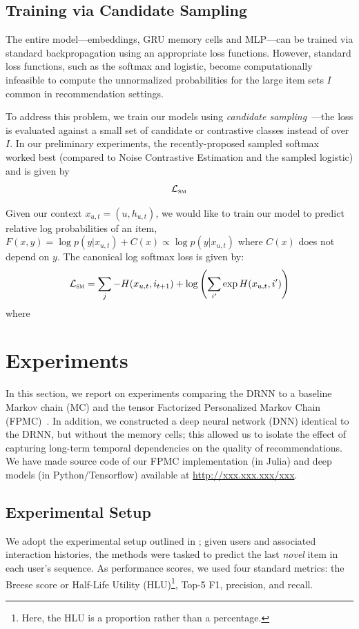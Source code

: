 \documentclass{sig-alternate-05-2015}
\begin{document}
\subsection{Training via Candidate Sampling}
The entire model---embeddings, GRU memory cells and MLP---can be trained via standard backpropagation using an appropriate loss functions. However, standard loss functions, such as the softmax and logistic, become computationally infeasible to compute the unnormalized probabilities for the large item sets $I$ common in recommendation settings.

To address this problem, we train our models using \emph{candidate sampling}~\cite{TFCandidateSampling}---the loss is evaluated against a small set of candidate or contrastive classes instead of over $I$. In our preliminary experiments, the recently-proposed sampled softmax~\cite{Jean2015} worked best (compared to Noise Contrastive Estimation and the sampled logistic) and is given by
\begin{align}
	\mathcal{L}_{\textsc{sm}}
\end{align}

Given our context $x_{u,t} = (u, h_{u,t})$, we would like to train our model to predict relative log probabilities of an item, $F(x,y) = \log p(y|x_{u,t}) + C(x) \propto \log p(y|x_{u,t})$ where $C(x)$ does not depend on $y$. The canonical log softmax loss is given by:
\begin{align}
	\mathcal{L}_{\textsc{sm}} = \sum_j -H(x_{u,t}, i_{t+1}) + \log \left( \sum_{i'} \exp H(x_{u,t}, i') \right)
\end{align}
where 


\section{Experiments}
In this section, we report on experiments comparing the DRNN to a baseline Markov chain (MC) and the tensor Factorized Personalized Markov Chain (FPMC)~\cite{Rendle2010}. In addition, we constructed a deep neural network (DNN) identical to the DRNN, but without the memory cells; this allowed us to isolate the effect of capturing long-term temporal dependencies on the quality of recommendations. We have made source code of our FPMC implementation (in Julia) and deep models (in Python/Tensorflow) available at \url{http://xxx.xxx.xxx/xxx}.

\subsection{Experimental Setup}
We adopt the experimental setup outlined in \cite{Rendle2010};  given users and associated interaction histories, the methods were tasked to predict the last \emph{novel} item in each user's sequence. As performance scores, we used four standard metrics: the Breese score or Half-Life Utility (HLU)\footnote{Here, the HLU is a proportion rather than a percentage.}, Top-5 F1, precision, and recall. 
\end{document}
